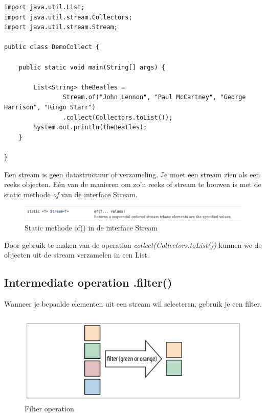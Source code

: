\begin{lstlisting}
import java.util.List;
import java.util.stream.Collectors;
import java.util.stream.Stream;

public class DemoCollect {

	public static void main(String[] args) {

		List<String> theBeatles = 
				Stream.of("John Lennon", "Paul McCartney", "George Harrison", "Ringo Starr")
				.collect(Collectors.toList());
		System.out.println(theBeatles);
	}

}
\end{lstlisting}

Een stream is geen datastructuur of verzameling. Je moet een stream zien als een reeks objecten. E\'en van de manieren om zo'n reeks of stream te bouwen is met de static methode \textit{of} van de interface Stream.

\begin{figure}[H]
  \includegraphics[width=\linewidth]{images/chapter_streams/stream_of.png}
  \caption{Static methode of() in de interface Stream}
  \label{fig:stream_of}
\end{figure}

Door gebruik te maken van de operation \textit{collect(Collectors.toList())} kunnen we de objecten uit de stream verzamelen in een List.

\subsection{Intermediate operation .filter()}

Wanneer je bepaalde elementen uit een stream wil selecteren, gebruik je een filter. 

\begin{figure}[H]
  \includegraphics[width=\linewidth]{images/chapter_streams/illustration_filter.png}
  \caption{Filter operation}
  \label{fig:filter_operation}
\end{figure}

